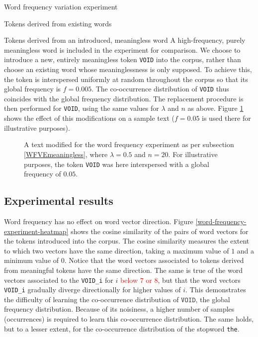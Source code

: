 \documentclass{article} %
\newcommand{\word}[1]{\texttt{#1}}
\begin{document}
\begin{section}{Word frequency variation experiment}
\begin{subsection}{Tokens derived from existing words}
\end{subsection}

\begin{subsection}{Tokens derived from an introduced, meaningless word}\label{WFVEmeaningless}
	A high-frequency, purely meaningless word is included in the experiment for comparison.
	We choose to introduce a new, entirely meaningless token \word{VOID} into the corpus, rather than choose an existing word whose meaninglessness is only supposed.
	To achieve this, the token is interspersed uniformly at random throughout the corpus so that its global frequency is $f = 0.005$.
	The co-occurrence distribution of \word{VOID} thus coincides with the global frequency distribution.
	The replacement procedure is then performed for \word{VOID}, using the same values for $\lambda$ and $n$ as above.
	Figure \ref{fig:word-frequency-experiment-text-void} shows the effect of this modifications on a sample text ($f = 0.05$ is used there for illustrative purposes).

\begin{figure}\label{fig:word-frequency-experiment-text-void}
	
	\caption{A text modified for the word frequency experiment as per subsection \ref{WFVEmeaningless}, where $\lambda=0.5$ and $n=20$. For illustrative purposes, the token \word{VOID} was here interspersed with a global frequency of $0.05$.}
\end{figure}
\end{subsection}

\subsection{Experimental results}
Word frequency has no effect on word vector direction.
Figure \ref{word-frequency-experiment-heatmap} shows the cosine similarity of the pairs of word vectors for the tokens introduced into the corpus.
The cosine similarity measures the extent to which two vectors have the same direction, taking a maximum value of $1$ and a minimum value of $0$.
Notice that the word vectors associated to tokens derived from meaningful tokens have the same direction.
The same is true of the word vectors associated to the \word{VOID\_i} for $i$ \textcolor{red}{below $7$ or $8$}, but that the word vectors \word{VOID\_i} gradually diverge directionally for higher values of $i$.
This demonstrates the difficulty of learning the co-occurrence distribution of $\word{VOID}$, the global frequency distribution.
Because of its noisiness, a higher number of samples (occurrences) is required to learn this co-occurrence distribution.
The same holds, but to a lesser extent, for the co-occurrence distribution of the stopword \word{the}.


\end{section}
\end{document}
